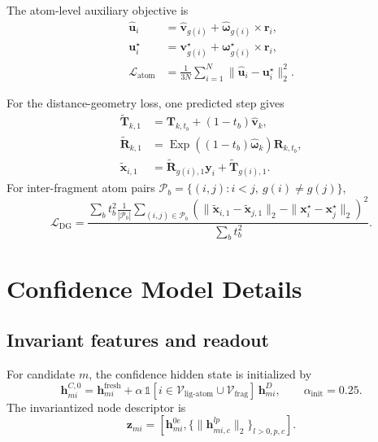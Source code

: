 The atom-level auxiliary objective is
\begin{align}
    \widehat{\mathbf{u}}_i
    &=
    \widehat{\mathbf{v}}_{g(i)}
    +
    \widehat{\boldsymbol{\omega}}_{g(i)}
    \times\mathbf{r}_i,\\
    \mathbf{u}^{\star}_i
    &=
    \mathbf{v}^{\star}_{g(i)}
    +
    \boldsymbol{\omega}^{\star}_{g(i)}
    \times\mathbf{r}_i,\\
    \mathcal{L}_{\mathrm{atom}}
    &=
    \frac{1}{3N}
    \sum_{i=1}^{N}
    \|\widehat{\mathbf{u}}_i-\mathbf{u}^{\star}_i\|_2^2.
    \label{eq:atom_aux_loss}
\end{align}

For the distance-geometry loss, one predicted step gives
\begin{align}
    \widetilde{\mathbf{T}}_{k,1}
    &=
    \mathbf{T}_{k,t_b}
    +(1-t_b)\widehat{\mathbf{v}}_k,\\
    \widetilde{\mathbf{R}}_{k,1}
    &=
    \operatorname{Exp}
    \left((1-t_b)\widehat{\boldsymbol{\omega}}_k\right)
    \mathbf{R}_{k,t_b},\\
    \widetilde{\mathbf{x}}_{i,1}
    &=
    \widetilde{\mathbf{R}}_{g(i),1}\mathbf{y}_i
    +\widetilde{\mathbf{T}}_{g(i),1}.
    \label{eq:one_step_endpoint}
\end{align}
For inter-fragment atom pairs
\(\mathcal{P}_b=\{(i,j):i<j,\ g(i)\neq g(j)\}\),
\begin{equation}
    \mathcal{L}_{\mathrm{DG}}
    =
    \frac{
      \sum_b t_b^2
      \frac{1}{|\mathcal{P}_b|}
      \sum_{(i,j)\in\mathcal{P}_b}
      \left(
        \|\widetilde{\mathbf{x}}_{i,1}
          -\widetilde{\mathbf{x}}_{j,1}\|_2
        -
        \|\mathbf{x}^{\star}_i-\mathbf{x}^{\star}_j\|_2
      \right)^2
    }{
      \sum_b t_b^2
    }.
    \label{eq:distance_geometry_loss}
\end{equation}

\section{Confidence Model Details}
\label{app:confidence_details}

\subsection{Invariant features and readout}

For candidate \(m\), the confidence hidden state is initialized by
\begin{equation}
    \mathbf{h}^{C,0}_{mi}
    =
    \mathbf{h}^{\mathrm{fresh}}_{mi}
    +
    \alpha\,
    \mathbb{1}
    [i\in\mathcal{V}_{\mathrm{lig\text{-}atom}}
      \cup\mathcal{V}_{\mathrm{frag}}]\,
    \mathbf{h}^{D}_{mi},
    \qquad \alpha_{\mathrm{init}}=0.25.
    \label{eq:confidence_hidden_init}
\end{equation}
The invariantized node descriptor is
\begin{equation}
    \mathbf{z}_{mi}
    =
    \left[
      \mathbf{h}_{mi}^{0e},
      \{\|\mathbf{h}_{mi,c}^{lp}\|_2\}_{l>0,p,c}
    \right].
    \label{eq:confidence_invariants}
\end{equation}

